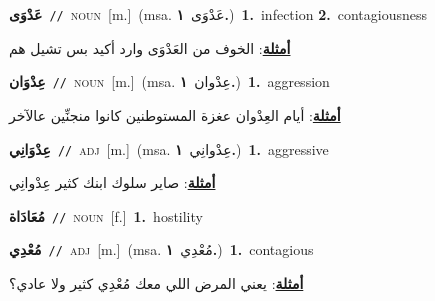 \documentclass[10pt,a4paper,twoside]{article} %
\begin{document}
\begin{multicols}{2}
{\setlength\topsep{0pt}\textbf{\foreignlanguage{arabic}{عَدْوَى}}\ {\color{gray}\texttt{//}\color{black}}\ \textsc{noun}\ [m.]\ \color{gray}(msa. \foreignlanguage{arabic}{عَدْوَى}~\foreignlanguage{arabic}{\textbf{١.}})\color{black}\ \textbf{1.}~infection  \textbf{2.}~contagiousness\  \begin{flushright}\color{gray}\foreignlanguage{arabic}{\textbf{\underline{\foreignlanguage{arabic}{أمثلة}}}: الخوف من العَدْوَى وارد أكيد بس تشيل هم}\end{flushright}\color{black}} \vspace{2mm}

{\setlength\topsep{0pt}\textbf{\foreignlanguage{arabic}{عِدْوَان}}\ {\color{gray}\texttt{//}\color{black}}\ \textsc{noun}\ [m.]\ \color{gray}(msa. \foreignlanguage{arabic}{عِدْوان}~\foreignlanguage{arabic}{\textbf{١.}})\color{black}\ \textbf{1.}~aggression\  \begin{flushright}\color{gray}\foreignlanguage{arabic}{\textbf{\underline{\foreignlanguage{arabic}{أمثلة}}}: أيام العِدْوان عغزة المستوطنين كانوا منجنِّين عالآخر}\end{flushright}\color{black}} \vspace{2mm}

{\setlength\topsep{0pt}\textbf{\foreignlanguage{arabic}{عِدْوَانِي}}\ {\color{gray}\texttt{//}\color{black}}\ \textsc{adj}\ [m.]\ \color{gray}(msa. \foreignlanguage{arabic}{عِدْوانِي}~\foreignlanguage{arabic}{\textbf{١.}})\color{black}\ \textbf{1.}~aggressive\  \begin{flushright}\color{gray}\foreignlanguage{arabic}{\textbf{\underline{\foreignlanguage{arabic}{أمثلة}}}: صاير سلوك ابنك كثير عِدْوانِي}\end{flushright}\color{black}} \vspace{2mm}

{\setlength\topsep{0pt}\textbf{\foreignlanguage{arabic}{مُعَادَاة}}\ {\color{gray}\texttt{//}\color{black}}\ \textsc{noun}\ [f.]\ \textbf{1.}~hostility\ } \vspace{2mm}

{\setlength\topsep{0pt}\textbf{\foreignlanguage{arabic}{مُعْدِي}}\ {\color{gray}\texttt{//}\color{black}}\ \textsc{adj}\ [m.]\ \color{gray}(msa. \foreignlanguage{arabic}{مُعْدِي}~\foreignlanguage{arabic}{\textbf{١.}})\color{black}\ \textbf{1.}~contagious\  \begin{flushright}\color{gray}\foreignlanguage{arabic}{\textbf{\underline{\foreignlanguage{arabic}{أمثلة}}}: يعني المرض اللي معك مُعْدِي كثير ولا عادي؟}\end{flushright}\color{black}} \vspace{2mm}


\end{multicols}
\end{document}
